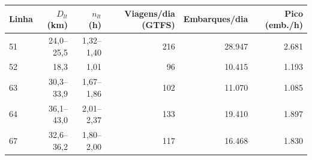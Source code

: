 \begin{tabular}{lrrrrr}
\toprule
Linha & $D_{lt}$ (km) & $n_{lt}$ (h) & Viagens/dia (GTFS) & Embarques/dia & Pico (emb./h) \\
\midrule
51 & 24{,}0--25{,}5 & 1{,}32--1{,}40 & 216 & 28.947 & 2.681 \\
52 & 18{,}3 & 1{,}01 & 96 & 10.415 & 1.193 \\
63 & 30{,}3--33{,}9 & 1{,}67--1{,}86 & 102 & 11.070 & 1.085 \\
64 & 36{,}1--43{,}0 & 2{,}01--2{,}37 & 133 & 19.410 & 1.897 \\
67 & 32{,}6--36{,}2 & 1{,}80--2{,}00 & 117 & 16.468 & 1.830 \\
\bottomrule
\end{tabular}
